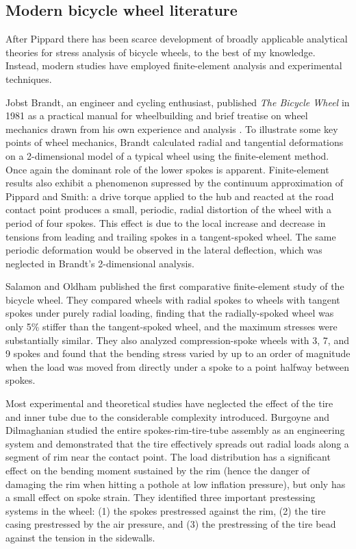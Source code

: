 \documentclass[../thesis.tex]{subfiles}
\begin{document}
\subsection{Modern bicycle wheel literature}

After Pippard there has been scarce development of broadly applicable analytical theories for stress analysis of bicycle wheels, to the best of my knowledge. Instead, modern studies have employed finite-element analysis and experimental techniques.

Jobst Brandt, an engineer and cycling enthusiast, published \emph{The Bicycle Wheel} in 1981 as a practical manual for wheelbuilding and brief treatise on wheel mechanics drawn from his own experience and analysis \cite{Brandt1993}. To illustrate some key points of wheel mechanics, Brandt calculated radial and tangential deformations on a 2-dimensional model of a typical wheel using the finite-element method. Once again the dominant role of the lower spokes is apparent. Finite-element results also exhibit a phenomenon supressed by the continuum approximation of Pippard and Smith: a drive torque applied to the hub and reacted at the road contact point produces a small, periodic, radial distortion of the wheel with a period of four spokes. This effect is due to the local increase and decrease in tensions from leading and trailing spokes in a tangent-spoked wheel. The same periodic deformation would be observed in the lateral deflection, which was neglected in Brandt's 2-dimensional analysis.

Salamon and Oldham published the first comparative finite-element study of the bicycle wheel. They compared wheels with radial spokes to wheels with tangent spokes under purely radial loading, finding that the radially-spoked wheel was only 5\% stiffer than the tangent-spoked wheel, and the maximum stresses were substantially similar. They also analyzed compression-spoke wheels with 3, 7, and 9 spokes and found that the bending stress varied by up to an order of magnitude when the load was moved from directly under a spoke to a point halfway between spokes.

Most experimental and theoretical studies have neglected the effect of the tire and inner tube due to the considerable complexity introduced. Burgoyne and Dilmaghanian \cite{Burgoyne1993} studied the entire spokes-rim-tire-tube assembly as an engineering system and demonstrated that the tire effectively spreads out radial loads along a segment of rim near the contact point. The load distribution has a significant effect on the bending moment sustained by the rim (hence the danger of damaging the rim when hitting a pothole at low inflation pressure), but only has a small effect on spoke strain. They identified three important prestessing systems in the wheel: (1) the spokes prestressed against the rim, (2) the tire casing prestressed by the air pressure, and (3) the prestressing of the tire bead against the tension in the sidewalls.
\end{document}
